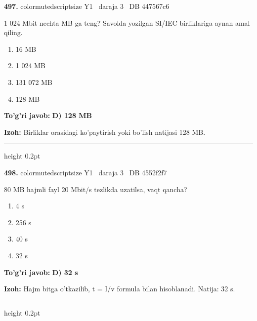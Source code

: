 \documentclass[10pt,a4paper,oneside]{article}
\begin{document}
\noindent\textbf{\color{ink}497.}  {color{muted}scriptsize Y1 \textbullet\ daraja 3 \textbullet\ DB 447567c6}
\par
1 024 Mbit nechta MB ga teng? Savolda yozilgan SI/IEC birliklariga aynan amal qiling.
\begin{enumerate}[label=\Alph*),leftmargin=9mm]
\item 16 MB
\item 1 024 MB
\item 131 072 MB
\item 128 MB
\end{enumerate}
\begin{tcolorbox}[enhanced,breakable,colback=teal!4,colframe=teal!50!black,boxrule=0.5pt,arc=1.1mm,left=3mm,right=3mm,top=1.7mm,bottom=1.7mm,before skip=2mm,after skip=2mm]
\textbf{\color{teal}To'g'ri javob:} \textbf{D) 128 MB}
\par\smallskip
\textbf{Izoh:} Birliklar orasidagi ko'paytirish yoki bo'lish natijasi 128 MB.
\end{tcolorbox}
\vspace{2mm}\hrule height 0.2pt \vspace{3mm}

\noindent\textbf{\color{ink}498.}  {color{muted}scriptsize Y1 \textbullet\ daraja 3 \textbullet\ DB 4552f2f7}
\par
80 MB hajmli fayl 20 Mbit/s tezlikda uzatilsa, vaqt qancha?
\begin{enumerate}[label=\Alph*),leftmargin=9mm]
\item 4 s
\item 256 s
\item 40 s
\item 32 s
\end{enumerate}
\begin{tcolorbox}[enhanced,breakable,colback=teal!4,colframe=teal!50!black,boxrule=0.5pt,arc=1.1mm,left=3mm,right=3mm,top=1.7mm,bottom=1.7mm,before skip=2mm,after skip=2mm]
\textbf{\color{teal}To'g'ri javob:} \textbf{D) 32 s}
\par\smallskip
\textbf{Izoh:} Hajm bitga o'tkazilib, t = I/v formula bilan hisoblanadi. Natija: 32 s.
\end{tcolorbox}
\vspace{2mm}\hrule height 0.2pt \vspace{3mm}
\end{document}
